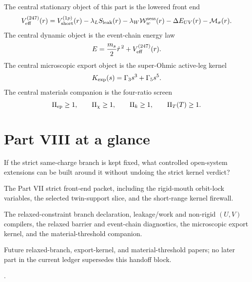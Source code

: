 The central stationary object of this part is the lowered front end
\begin{equation}
\label{eq:part08-intro-veff230}
V_{\rm eff}^{(247)}(r)
=
V_{\rm short}^{(1p)}(r)
-
\lambda_L S_{\rm leak}(r)
-
\lambda_W\mathcal W_w^{\rm sess}(r)
-
\Delta E_{UV}(r)
-
\mathcal M_{\sigma}(r).
\end{equation}
The central dynamic object is the event-chain energy law
\begin{equation}
\label{eq:part08-intro-event-energy}
E=\frac{m_s}{2}\dot r^{\,2}+V_{\rm eff}^{(247)}(r).
\end{equation}
The central microscopic export object is the super-Ohmic active-leg kernel
\begin{equation}
\label{eq:part08-intro-export-kernel}
K_{\rm exp}(s)=\Gamma_3s^3+\Gamma_5s^5.
\end{equation}
The central materials companion is the four-ratio screen
\begin{equation}
\label{eq:part08-intro-material-screen}
\Pi_{\rm ep}\ge 1,
\qquad
\Pi_{\chi}\ge 1,
\qquad
\Pi_k\ge 1,
\qquad
\Pi_T(T)\ge 1.
\end{equation}

\section*{Part VIII at a glance}

\begin{readermap}
\item[Primary question] If the strict same-charge branch is kept fixed, what controlled open-system extensions can be built around it without undoing the strict kernel verdict?
\item[Starting inputs] The Part VII strict front-end packet, including the rigid-mouth orbit-lock variables, the selected twin-support slice, and the short-range kernel firewall.
\item[Delivers] The relaxed-constraint branch declaration, leakage/work and non-rigid \((U,V)\) compilers, the relaxed barrier and event-chain diagnostics, the microscopic export kernel, and the material-threshold companion.
\item[Used by] Future relaxed-branch, export-kernel, and material-threshold papers; no later part in the current ledger supersedes this handoff block.
\item[Result anchors] .
\end{readermap}

